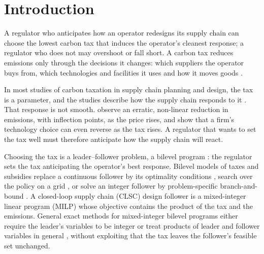 \documentclass[review,11pt,nonatbib]{elsarticle}
\theoremstyle{remark}
\begin{document}
\section{Introduction}\label{sec:intro}

A regulator who anticipates how an operator redesigns its supply chain can choose the lowest carbon tax that induces the operator's cleanest response; a regulator who does not may overshoot or fall short. A carbon tax reduces emissions only through the decisions it changes: which suppliers the operator buys from, which technologies and facilities it uses and how it moves goods \parencite{palak2014analyzing,marufuzzaman2014environmentally,drake2016technology,waltho2019green}.

In most studies of carbon taxation in supply chain planning and design, the tax is a parameter, and the studies describe how the supply chain responds to it \parencite{fahimnia2015tactical,zakeri2015carbon,haddadsisakht2018closed,waltho2019green}. That response is not smooth. \textcite{zakeri2015carbon} observe an erratic, non-linear reduction in emissions, with inflection points, as the price rises, and \textcite{krass2013environmental} show that a firm's technology choice can even reverse as the tax rises. A regulator that wants to set the tax well must therefore anticipate how the supply chain will react.

Choosing the tax is a leader--follower problem, a bilevel program \parencite{kleinert2021survey}: the regulator sets the tax anticipating the operator's best response. Bilevel models of taxes and subsidies replace a continuous follower by its optimality conditions \parencite{almutairi2014carbon}, search over the policy on a grid \parencite{bard2000bilevel}, or solve an integer follower by problem-specific branch-and-bound \parencite{liu2023optimal}. A closed-loop supply chain (CLSC) design follower is a mixed-integer linear program (MILP) whose objective contains the product of the tax and the emissions. General exact methods for mixed-integer bilevel programs either require the leader's variables to be integer \parencite{lozano2017value} or treat products of leader and follower variables in general \parencite{mitsos2008global,merkert2022exact}, without exploiting that the tax leaves the follower's feasible set unchanged.
\end{document}
